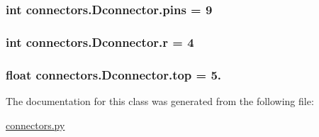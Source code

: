 \subsubsection[{pins}]{\setlength{\rightskip}{0pt plus 5cm}int connectors.\+Dconnector.\+pins = 9\hspace{0.3cm}{\ttfamily [static]}}\label{classconnectors_1_1_dconnector_ac9f751fdd098fc9475dba88bbf268f92}
\hypertarget{classconnectors_1_1_dconnector_ab0330b29404f3255b76a597f8f570c76}{}
\subsubsection[{r}]{\setlength{\rightskip}{0pt plus 5cm}int connectors.\+Dconnector.\+r = 4\hspace{0.3cm}{\ttfamily [static]}}\label{classconnectors_1_1_dconnector_ab0330b29404f3255b76a597f8f570c76}
\hypertarget{classconnectors_1_1_dconnector_a1de06b15537f4f7a27d89b1110323291}{}
\subsubsection[{top}]{\setlength{\rightskip}{0pt plus 5cm}float connectors.\+Dconnector.\+top = 5.\hspace{0.3cm}{\ttfamily [static]}}\label{classconnectors_1_1_dconnector_a1de06b15537f4f7a27d89b1110323291}


The documentation for this class was generated from the following file\+:\begin{DoxyCompactItemize}
\item 
\hyperlink{connectors_8py}{connectors.\+py}\end{DoxyCompactItemize}
